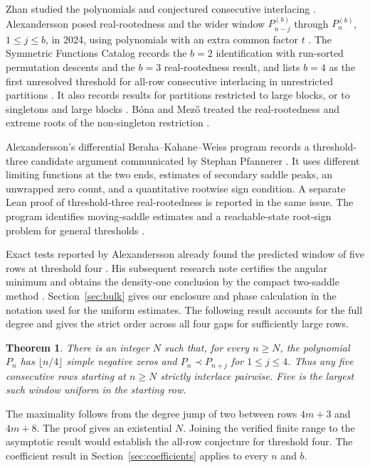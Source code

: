 \documentclass[11pt]{article}
\newtheorem{theorem}{Theorem}
\begin{document}
Zhan studied the polynomials and conjectured consecutive interlacing \cite[Thm.~3.3 and Sec.~3.1.1]{zhan}. Alexandersson posed real-rootedness and the wider window \(P^{(b)}_{n-j}\) through \(P^{(b)}_n\), \(1\le j\le b\), in 2024, using polynomials with an extra common factor \(t\) \cite{mo}. The Symmetric Functions Catalog records the \(b=2\) identification with run-sorted permutation descents \cite{an} and the \(b=3\) real-rootedness result, and lists \(b=4\) as the first unresolved threshold for all-row consecutive interlacing in unrestricted partitions \cite{symcat}. It also records results for partitions restricted to large blocks, or to singletons and large blocks \cite{symcatsp}. Bóna and Mező treated the real-rootedness and extreme roots of the non-singleton restriction \cite{bm}.

Alexandersson's differential Beraha--Kahane--Weiss program records a threshold-three candidate argument communicated by Stephan Pfannerer \cite{rrbkw}. It uses different limiting functions at the two ends, estimates of secondary saddle peaks, an unwrapped zero count, and a quantitative rootwise sign condition. A separate Lean proof of threshold-three real-rootedness is reported in the same issue. The program identifies moving-saddle estimates and a reachable-state root-sign problem for general thresholds \cite{rrbkw,rrreachable}.

Exact tests reported by Alexandersson already found the predicted window of five rows at threshold four \cite{rrfinite}. His subsequent research note certifies the angular minimum and obtains the density-one conclusion by the compact two-saddle method \cite{rrdensity}. Section~\ref{sec:bulk} gives our enclosure and phase calculation in the notation used for the uniform estimates. The following result accounts for the full degree and gives the strict order across all four gaps for sufficiently large rows.

\begin{theorem}\label{thm:main}
There is an integer \(N\) such that, for every \(n\ge N\), the polynomial \(P_n\) has \(\lfloor n/4\rfloor\) simple negative zeros and \(P_n\prec P_{n+j}\) for \(1\le j\le4\). Thus any five consecutive rows starting at \(n\ge N\) strictly interlace pairwise. Five is the largest such window uniform in the starting row.
\end{theorem}

The maximality follows from the degree jump of two between rows \(4m+3\) and \(4m+8\). The proof gives an existential \(N\). Joining the verified finite range to the asymptotic result would establish the all-row conjecture for threshold four. The coefficient result in Section~\ref{sec:coefficients} applies to every \(n\) and \(b\).
\end{document}
